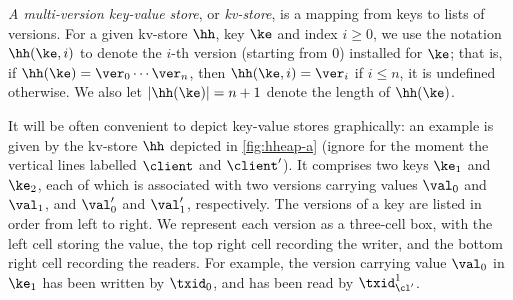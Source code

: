 \emph{A multi-version key-value store}, or \emph{kv-store}, 
is a mapping from keys to lists of versions. 
For a given kv-store $\hh$, key $\ke$ and index $i \geq 0$, we use the notation $\hh(\ke, i)$ 
to denote the $i$-th version (starting from $0$) installed for $\ke$; that is, if $\hh(\ke) = \ver_0 \cdots\ver_{n}$, then 
$\hh(\ke, i) = \ver_{i}$ if $i \leq n$, it is undefined otherwise. We also let $\lvert \hh(\ke) \rvert = n +1 $ denote 
the length of $\hh(\ke)$.

It will be often convenient to depict key-value stores graphically: an 
example is given by the kv-store $\hh$ depicted in \cref{fig:hheap-a}
{\color{red} (ignore for the moment the vertical lines labelled $\client$ and $\client'$)}. 
It comprises two keys \( \ke_1\) and \( \ke_2 \), 
each of which is associated with two versions carrying values $\val_0$ and $\val_1$, and $\val'_0$ and $\val'_1$, respectively.
The versions of a key are listed in order from left to right. 
We represent each version as a three-cell box, with the left cell storing the value, the top right cell recording the writer, and the bottom right cell recording the readers. 
For example, the version carrying value $\val_0$ in $\ke_1$ has been written by $\txid_0$, and has been read by $\txid_{\cl'}^1$.

